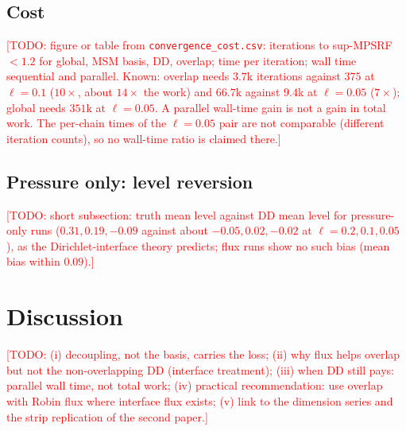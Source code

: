 \documentclass[11pt]{article}
\newcommand{\todo}[1]{\textcolor{red}{[TODO: #1]}}
\begin{document}
\subsection{Cost}
\todo{figure or table from \texttt{convergence\_cost.csv}: iterations to sup-MPSRF $<1.2$ for global, MSM basis, DD, overlap; time per iteration; wall time sequential and parallel. Known: overlap needs $3.7$k iterations against $375$ at $\ell=0.1$ ($10\times$, about $14\times$ the work) and $66.7$k against $9.4$k at $\ell=0.05$ ($7\times$); global needs $351$k at $\ell=0.05$. A parallel wall-time gain is not a gain in total work. The per-chain times of the $\ell=0.05$ pair are not comparable (different iteration counts), so no wall-time ratio is claimed there.}

\subsection{Pressure only: level reversion}
\todo{short subsection: truth mean level against DD mean level for pressure-only runs ($0.31,0.19,-0.09$ against about $-0.05, 0.02, -0.02$ at $\ell=0.2,0.1,0.05$), as the Dirichlet-interface theory predicts; flux runs show no such bias (mean bias within $0.09$).}

\section{Discussion}\label{sec:discussion}
\todo{(i) decoupling, not the basis, carries the loss; (ii) why flux helps overlap but not the non-overlapping DD (interface treatment); (iii) when DD still pays: parallel wall time, not total work; (iv) practical recommendation: use overlap with Robin flux where interface flux exists; (v) link to the dimension series and the strip replication of the second paper.}
\end{document}
